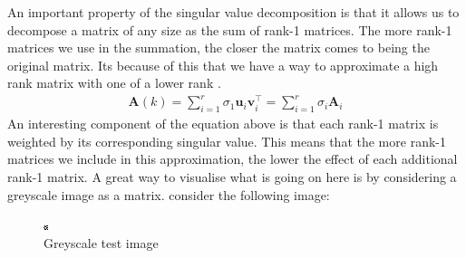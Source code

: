 \documentclass[a4paper,12pt]{article}
\newcommand{\matrx}[1]{\bm{#1}}
\newcommand{\vectr}[1]{\textbf{#1}}
\begin{document}
	An important property of the singular value decomposition is that it allows us to decompose a matrix of any size as the sum of rank-1 matrices. The more rank-1 matrices we use in the summation, the closer the matrix comes to being the original matrix. Its because of this that we have a way to approximate a high rank matrix with one of a lower rank \cite{def_sum_low_rank}. 
	\begin{align}
		\matrx{A}(k) = \sum_{i = 1}^{r} \sigma_1 \vectr{u}_i \vectr{v}_i ^{\top} = \sum_{i = 1}^{r} \sigma_i \matrx{A}_i
		\label{rank_k_approximation}
	\end{align}
	An interesting component of the equation above is that each rank-1 matrix is weighted by its corresponding singular value. This means that the more rank-1 matrices we include in this approximation, the lower the effect of each additional rank-1 matrix. A great way to visualise what is going on here is by considering a greyscale image as a matrix. consider the following image:
	\begin{figure}[h]
		\centering
		\includegraphics*[scale = 10]{pixel_art.png}
		\caption{Greyscale test image}
	\end{figure}
	
\end{document}
